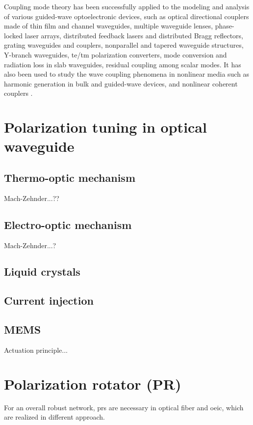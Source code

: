 \documentclass[../report.tex]{subfiles}
\begin{document}
\par 
Coupling mode theory has been successfully applied to the modeling and analysis of various guided-wave optoelectronic devices, such as optical directional couplers made of thin film and channel waveguides, multiple waveguide lenses, phase-locked laser arrays, distributed feedback lasers and distributed Bragg reflectors, grating waveguides and couplers, nonparallel and tapered waveguide structures, Y-branch waveguides, \gls{te}/\gls{tm} polarization converters, mode conversion and radiation loss in slab waveguides, residual coupling among scalar modes. It has also been used to study the wave coupling phenomena in nonlinear media such as harmonic generation in bulk and guided-wave devices, and nonlinear coherent couplers \cite{haus_coupled_1991}.
	
	\section{Polarization tuning in optical waveguide}
		\subsection{Thermo-optic mechanism}
		Mach-Zehnder...?? 
		\subsection{Electro-optic mechanism}
		Mach-Zehnder...? 
		\subsection{Liquid crystals}
		
		\subsection{Current injection}
		
		\subsection{MEMS}
		Actuation principle... 	
			
	\section{Polarization rotator (PR)}
For an overall robust network, \gls{pr}s are necessary in optical fiber and \gls{oeic}, which are realized in different approach.	
\end{document}
